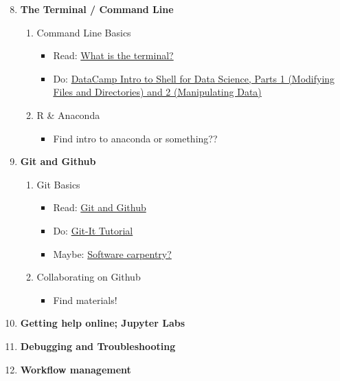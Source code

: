 \documentclass[12pt]{article}
\begin{document}
\begin{enumerate}[label=\textbf{Week \arabic*:}]
	\setcounter{enumi}{7}
	\item \textbf{The Terminal / Command Line}
	\begin{enumerate}[label=Class \arabic*:]
		\item Command Line Basics
		\begin{itemize}
			\item Read: \href{https://www.programming4ds.com/html/terminal.html}{What is the terminal?}
			\item Do: \href{https://campus.datacamp.com/courses/introduction-to-shell-for-data-science/}{DataCamp Intro to Shell for Data Science, Parts 1 (Modifying Files and Directories) and 2 (Manipulating Data)}
		\end{itemize}
		\item R \& Anaconda
		\begin{itemize}
			\item Find intro to anaconda or something??
		\end{itemize}
	\end{enumerate}

	\item \textbf{Git and Github}
	\begin{enumerate}[label=Class \arabic*:]
		\item Git Basics
		\begin{itemize}
			\item Read: \href{https://www.programming4ds.com/html/git_and_github.html}{Git and Github}
			\item Do: \href{http://jlord.us/git-it/}{Git-It Tutorial}
			\item Maybe: \href{http://swcarpentry.github.io/git-novice/03-create/index.html}{Software carpentry?}
		\end{itemize}
		\item Collaborating on Github
		\begin{itemize}
			\item Find materials!
		\end{itemize}
	\end{enumerate}
	\item \textbf{Getting help online; Jupyter Labs}
	\item \textbf{Debugging and Troubleshooting}
	\item \textbf{Workflow management}
\end{enumerate}
\end{document}
